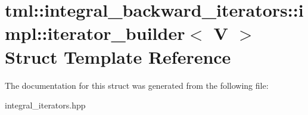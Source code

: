 \hypertarget{structtml_1_1integral__backward__iterators_1_1impl_1_1iterator__builder}{\section{tml\+:\+:integral\+\_\+backward\+\_\+iterators\+:\+:impl\+:\+:iterator\+\_\+builder$<$ V $>$ Struct Template Reference}
\label{structtml_1_1integral__backward__iterators_1_1impl_1_1iterator__builder}
}


The documentation for this struct was generated from the following file\+:\begin{DoxyCompactItemize}
\item 
integral\+\_\+iterators.\+hpp\end{DoxyCompactItemize}

